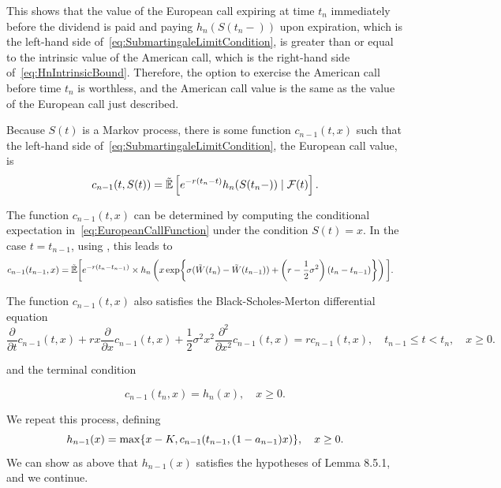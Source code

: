 This shows that the value of the European call expiring at time \(t_n\) immediately before the dividend is paid and paying \(h_n(S(t_n-))\) upon expiration, which is the left-hand side of~\eqref{eq:SubmartingaleLimitCondition}, is greater than or equal to the intrinsic value of the American call, which is the right-hand side of~\eqref{eq:HnIntrinsicBound}. Therefore, the option to exercise the American call before time \(t_n\) is worthless, and the American call value is the same as the value of the European call just described.

Because \(S(t)\) is a Markov process, there is some function \(c_{n-1}(t, x)\) such that the left-hand side of~\eqref{eq:SubmartingaleLimitCondition}, the European call value, is
\begin{equation}
	c_{n-1}(t, S(t)) = \tilde{\E} \left[ e^{-r(t_n-t)}h_n(S(t_n-)) \mid \cF(t) \right]. \label{eq:EuropeanCallFunction}
\end{equation}

The function \(c_{n-1}(t, x)\) can be determined by computing the conditional expectation in~\eqref{eq:EuropeanCallFunction} under the condition \(S(t) = x\). In the case \(t = t_{n-1}\), using , this leads to
\begin{align}
	c_{n-1}(t_{n-1}, x)
	 & = \tilde{\E} \bigg[ e^{-r(t_n-t_{n-1})}
		\times h_n \left( x \exp \set[\bigg]{ \sigma (\tilde{W}(t_n) - \tilde{W}(t_{n-1})) + \left( r - \frac{1}{2}\sigma^2 \right) (t_n - t_{n-1}) } \right) \bigg]. \label{eq:RecursiveExpectationFormula}
\end{align}

The function \(c_{n-1}(t, x)\) also satisfies the Black-Scholes-Merton differential equation
\begin{equation}
	\frac{\partial}{\partial t}c_{n-1}(t, x) + rx \frac{\partial}{\partial x}c_{n-1}(t, x) + \frac{1}{2}\sigma^2 x^2 \frac{\partial^2}{\partial x^2}c_{n-1}(t, x) = r c_{n-1}(t, x), \quad t_{n-1} \leq t < t_n, \quad x \geq 0. \label{eq:BlackScholesMertonPDE}
\end{equation}

and the terminal condition

\begin{equation}
	c_{n-1}(t_n, x) = h_n(x), \quad x \ge 0.
	\label{eq:CNMinusOneTerminalAtTn}
\end{equation}

We repeat this process, defining
\[
	h_{n-1}(x) = \max \set{ x - K, c_{n-1}(t_{n-1}, (1 - a_{n-1})x) }, \quad x \ge 0.
\]
We can show as above that \(h_{n-1}(x)\) satisfies the hypotheses of Lemma 8.5.1, and we continue.

